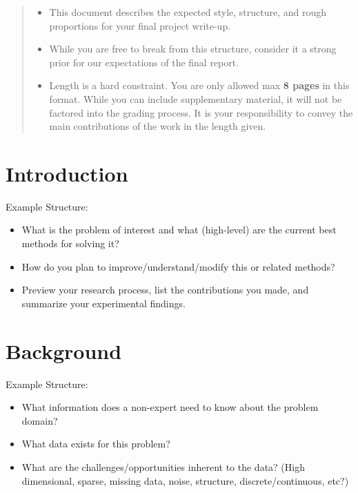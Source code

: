 \documentclass{article}
\begin{document}

\begin{abstract}
  \begin{itemize}
  \item This document describes the expected style, structure, and rough proportions for your final project write-up.
  \item While you are free to break from this structure, consider it a strong prior for our expectations of the final report.
\item Length is a hard constraint. You are only allowed max \textbf{8 pages} in this format. While you can include supplementary material, it will not be factored into the grading process. It is your responsibility to convey the main contributions of the work in the length given.
  \end{itemize}



\end{abstract}

\section{Introduction}
\label{sec:introduction}

Example Structure:
\begin{itemize}
\item What is the problem of interest and what (high-level) are the current best methods for solving it?
\item How do you plan to improve/understand/modify this or related methods?
\item Preview your research process, list the contributions you made, and summarize your experimental findings.
\end{itemize}


\section{Background}
Example Structure:
\begin{itemize}
\item What information does a non-expert need to know about the problem domain?
\item What data exists for this problem?
\item What are the challenges/opportunities inherent to the data? (High dimensional, sparse, missing data, noise, structure, discrete/continuous, etc?)
\end{itemize}
\end{document}
